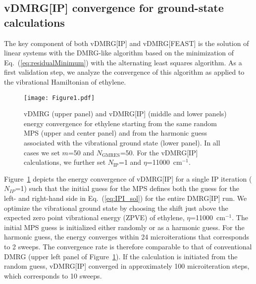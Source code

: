 \documentclass[journal=jctcce]{achemso}
\begin{document}
\subsection{vDMRG[IP] convergence for ground-state calculations}

The key component of both vDMRG[IP] and vDMRG[FEAST] is the solution of linear systems with the DMRG-like algorithm based on the minimization of Eq.~(\ref{eq:residualMinimum}) with the alternating least squares algorithm.
As a first validation step, we analyze the convergence of this algorithm as applied to the vibrational Hamiltonian of ethylene.

\begin{figure}[htbp!]
  \centering
  \texttt{[image: Figure1.pdf]}
  \caption{vDMRG (upper panel) and vDMRG[IP] (middle and lower panels) energy convergence for ethylene starting from 
the same random MPS (upper and center panel) and from the harmonic guess associated with the vibrational ground state (lower panel).
  In all cases we set $m$=50 and $N_\text{GMRES}$=50.
  For the vDMRG[IP] calculations, we further set $N_\text{IP}$=1 and $\eta$=11000~cm$^{-1}$.}
  \label{fig:ZPVE_Ethylene}
\end{figure}

\noindent Figure~\ref{fig:ZPVE_Ethylene} depicts the energy convergence of vDMRG[IP] for a single IP iteration ($N_{IP}$=1) such that  the initial guess for the MPS defines both the guess for the left-  and  right-hand side  in Eq.~(\ref{eq:IPI_sol}) for the entire DMRG[IP] run.
We optimize the vibrational ground state by choosing the shift just above the expected zero point vibrational energy 
(ZPVE) of ethylene, $\eta$=11000~cm$^{-1}$.
The initial MPS guess is initialized either randomly or as a harmonic guess.
For the harmonic guess, the energy converges within 24 microiterations that corresponds to 2 sweeps.
The convergence rate is therefore comparable to that of conventional DMRG (upper left panel of Figure~\ref{fig:ZPVE_Ethylene}).
If the calculation is initiated from the random guess, vDMRG[IP] converged in approximately 100 microiteration steps, which corresponds to 10 sweeps.
\end{document}
